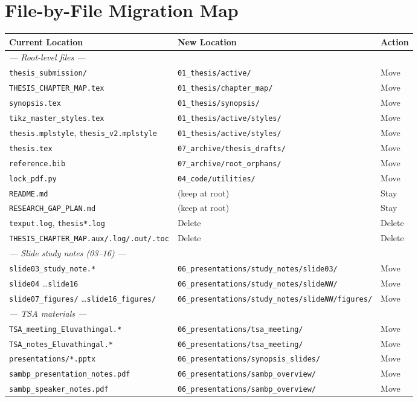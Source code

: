 \documentclass[11pt,a4paper]{article}
\newcommand{\cmd}[1]{\texttt{\small #1}}
\begin{document}
\newpage
\section{File-by-File Migration Map}

\begin{longtable}{p{5.2cm}p{6.8cm}l}
\toprule
\textbf{Current Location} & \textbf{New Location} & \textbf{Action} \\
\midrule
\endhead
\multicolumn{3}{l}{\textit{--- Root-level files ---}} \\
\cmd{thesis\_submission/} & \cmd{01\_thesis/active/} & Move \\
\cmd{THESIS\_CHAPTER\_MAP.tex} & \cmd{01\_thesis/chapter\_map/} & Move \\
\cmd{synopsis.tex} & \cmd{01\_thesis/synopsis/} & Move \\
\cmd{tikz\_master\_styles.tex} & \cmd{01\_thesis/active/styles/} & Move \\
\cmd{thesis.mplstyle}, \cmd{thesis\_v2.mplstyle} & \cmd{01\_thesis/active/styles/} & Move \\
\cmd{thesis.tex} & \cmd{07\_archive/thesis\_drafts/} & Move \\
\cmd{reference.bib} & \cmd{07\_archive/root\_orphans/} & Move \\
\cmd{lock\_pdf.py} & \cmd{04\_code/utilities/} & Move \\
\cmd{README.md} & (keep at root) & Stay \\
\cmd{RESEARCH\_GAP\_PLAN.md} & (keep at root) & Stay \\
\cmd{texput.log}, \cmd{thesis*.log} & Delete & Delete \\
\cmd{THESIS\_CHAPTER\_MAP.aux/.log/.out/.toc} & Delete & Delete \\[4pt]

\multicolumn{3}{l}{\textit{--- Slide study notes (03–16) ---}} \\
\cmd{slide03\_study\_note.*} & \cmd{06\_presentations/study\_notes/slide03/} & Move \\
\cmd{slide04} \ldots \cmd{slide16} & \cmd{06\_presentations/study\_notes/slide\textit{NN}/} & Move \\
\cmd{slide07\_figures/} \ldots \cmd{slide16\_figures/} & \cmd{06\_presentations/study\_notes/slide\textit{NN}/figures/} & Move \\[4pt]

\multicolumn{3}{l}{\textit{--- TSA materials ---}} \\
\cmd{TSA\_meeting\_Eluvathingal.*} & \cmd{06\_presentations/tsa\_meeting/} & Move \\
\cmd{TSA\_notes\_Eluvathingal.*} & \cmd{06\_presentations/tsa\_meeting/} & Move \\
\cmd{presentations/*.pptx} & \cmd{06\_presentations/synopsis\_slides/} & Move \\
\cmd{sambp\_presentation\_notes.pdf} & \cmd{06\_presentations/sambp\_overview/} & Move \\
\cmd{sambp\_speaker\_notes.pdf} & \cmd{06\_presentations/sambp\_overview/} & Move \\[4pt]


\end{longtable}
\end{document}
